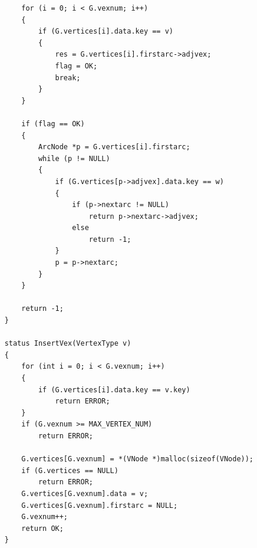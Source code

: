 \documentclass[supercite]{Experimental_Report}
\theoremstyle{definition}
\begin{document}
\begin{lstlisting}
        for (i = 0; i < G.vexnum; i++)
        {
            if (G.vertices[i].data.key == v)
            {
                res = G.vertices[i].firstarc->adjvex;
                flag = OK;
                break;
            }
        }

        if (flag == OK)
        {
            ArcNode *p = G.vertices[i].firstarc;
            while (p != NULL)
            {
                if (G.vertices[p->adjvex].data.key == w)
                {
                    if (p->nextarc != NULL)
                        return p->nextarc->adjvex;
                    else
                        return -1;
                }
                p = p->nextarc;
            }
        }

        return -1;
    }

    status InsertVex(VertexType v)
    {
        for (int i = 0; i < G.vexnum; i++)
        {
            if (G.vertices[i].data.key == v.key)
                return ERROR;
        }
        if (G.vexnum >= MAX_VERTEX_NUM)
            return ERROR;

        G.vertices[G.vexnum] = *(VNode *)malloc(sizeof(VNode));
        if (G.vertices == NULL)
            return ERROR;
        G.vertices[G.vexnum].data = v;
        G.vertices[G.vexnum].firstarc = NULL;
        G.vexnum++;
        return OK;
    }


\end{lstlisting}
\end{document}
